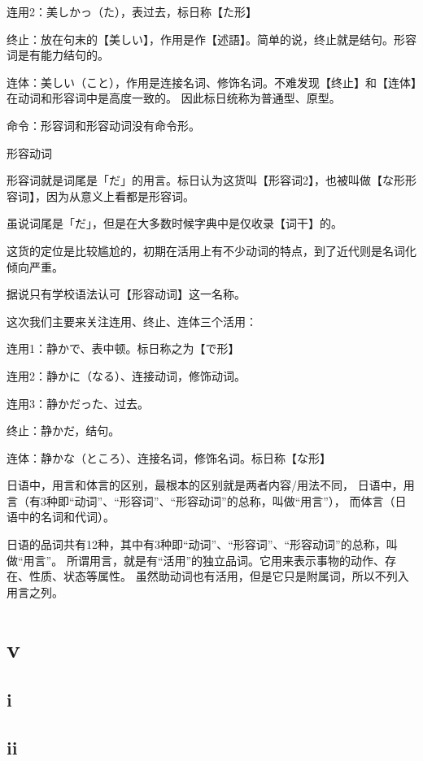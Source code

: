 连用2：美しかっ（た），表过去，标日称【た形】

终止：放在句末的【美しい】，作用是作【述語】。简单的说，终止就是结句。形容词是有能力结句的。

连体：美しい（こと），作用是连接名词、修饰名词。不难发现【终止】和【连体】在动词和形容词中是高度一致的。
    因此标日统称为普通型、原型。

命令：形容词和形容动词没有命令形。


形容动词

形容词就是词尾是「だ」的用言。标日认为这货叫【形容词2】，也被叫做【な形形容词】，因为从意义上看都是形容词。

虽说词尾是「だ」，但是在大多数时候字典中是仅收录【词干】的。

这货的定位是比较尴尬的，初期在活用上有不少动词的特点，到了近代则是名词化倾向严重。

据说只有学校语法认可【形容动词】这一名称。

这次我们主要来关注连用、终止、连体三个活用：

连用1：静かで、表中顿。标日称之为【で形】

连用2：静かに（なる）、连接动词，修饰动词。

连用3：静かだった、过去。

终止：静かだ，结句。

连体：静かな（ところ）、连接名词，修饰名词。标日称【な形】



日语中，用言和体言的区别，最根本的区别就是两者内容/用法不同，
日语中，用言（有3种即“动词”、“形容词”、“形容动词”的总称，叫做“用言”），
而体言（日语中的名词和代词）。

日语的品词共有12种，其中有3种即“动词”、“形容词”、“形容动词”的总称，叫做“用言”。
所谓用言，就是有“活用”的独立品词。它用来表示事物的动作、存在、性质、状态等属性。
虽然助动词也有活用，但是它只是附属词，所以不列入用言之列。

\section{v}

\newpage

\subsection{i}

\newpage

\subsection{ii}

